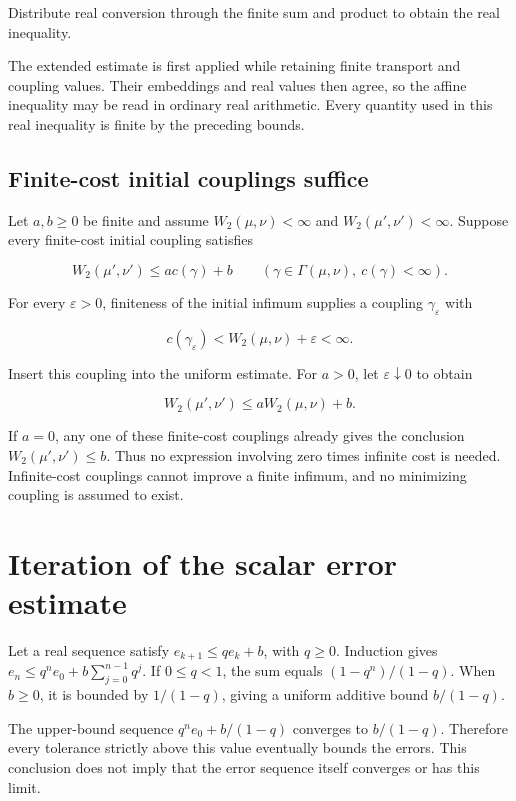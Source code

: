 \documentclass[11pt,a4paper]{article}
\begin{document}
Distribute real conversion through the finite sum and product to obtain the real inequality.



The extended estimate is first applied while retaining finite transport and coupling values. Their embeddings and real values then agree, so the affine inequality may be read in ordinary real arithmetic. Every quantity used in this real inequality is finite by the preceding bounds.


\subsection{\texorpdfstring{Finite-cost initial couplings suffice}{Finite-cost initial couplings suffice}}


Let \(a,b\ge0\) be finite and assume \(W_2(\mu,\nu)<\infty\) and \(W_2(\mu',\nu')<\infty\). Suppose every finite-cost initial coupling satisfies

\[W_2(\mu',\nu')\le a c(\gamma)+b\qquad
(\gamma\in\Gamma(\mu,\nu),\ c(\gamma)<\infty).\]


For every \(\varepsilon>0\), finiteness of the initial infimum supplies a coupling \(\gamma_\varepsilon\) with

\[c(\gamma_\varepsilon)<W_2(\mu,\nu)+\varepsilon<\infty.\]


Insert this coupling into the uniform estimate. For \(a>0\), let \(\varepsilon\downarrow0\) to obtain

\[W_2(\mu',\nu')\le aW_2(\mu,\nu)+b.\]


If \(a=0\), any one of these finite-cost couplings already gives the conclusion \(W_2(\mu',\nu')\le b\). Thus no expression involving zero times infinite cost is needed. Infinite-cost couplings cannot improve a finite infimum, and no minimizing coupling is assumed to exist.


\section{\texorpdfstring{Iteration of the scalar error estimate}{Iteration of the scalar error estimate}}


Let a real sequence satisfy \(e_{k+1}\le qe_k+b\), with \(q\ge0\). Induction gives \(e_n\le q^ne_0+b\sum_{j=0}^{n-1}q^j\). If \(0\le q<1\), the sum equals \((1-q^n)/(1-q)\). When \(b\ge0\), it is bounded by \(1/(1-q)\), giving a uniform additive bound \(b/(1-q)\).



The upper-bound sequence \(q^ne_0+b/(1-q)\) converges to \(b/(1-q)\). Therefore every tolerance strictly above this value eventually bounds the errors. This conclusion does not imply that the error sequence itself converges or has this limit.
\end{document}
